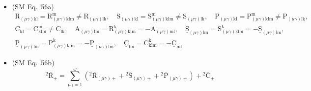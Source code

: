 \documentclass[
    12pt,              %
    a4paper,           %
    headings=normal,   %
    twoside=true,      %
    BCOR=8mm,          %
]{scrbook}
\begin{document}
\begin{itemize}[label={},leftmargin=0pt]
    \item (SM Eq.\ 56a) 
    \[
    \begin{gathered}
    \mathrm{R}_{(\mu\gamma)\mathrm{kl}} = \mathrm{R}^\mathrm{m}_{(\mu\gamma)\mathrm{klm}} \ne \mathrm{R}_{(\mu\gamma)\mathrm{lk}}, \quad \mathrm{S}_{(\mu\gamma)\mathrm{kl}} = \mathrm{S}^\mathrm{m}_{(\mu\gamma)\mathrm{klm}} \ne \mathrm{S}_{(\mu\gamma)\mathrm{lk}}, \quad \mathrm{P}_{(\mu\gamma)\mathrm{kl}} = \mathrm{P}^\mathrm{m}_{(\mu\gamma)\mathrm{klm}} \ne \mathrm{P}_{(\mu\gamma)\mathrm{lk}}, \\
    \mathrm{C}_{\mathrm{kl}} = \mathrm{C}^\mathrm{m}_{\mathrm{klm}} \ne \mathrm{C}_{\mathrm{lk}}, \quad \mathrm{A}_{(\mu\gamma)\mathrm{lm}} = \mathrm{R}^\mathrm{k}_{(\mu\gamma)\mathrm{klm}} = -\mathrm{A}_{(\mu\gamma)\mathrm{ml}}, \quad \underline{\mathrm{S}}_{(\mu\gamma)\mathrm{lm}} = \mathrm{S}^\mathrm{k}_{(\mu\gamma)\mathrm{klm}} = -\underline{\mathrm{S}}_{(\mu\gamma)\mathrm{lm}}, \\
    \underline{\mathrm{P}}_{(\mu\gamma)\mathrm{lm}} = \mathrm{P}^\mathrm{k}_{(\mu\gamma)\mathrm{klm}} = -\underline{\mathrm{P}}_{(\mu\gamma)\mathrm{lm}}, \quad \underline{\mathrm{C}}_{\mathrm{lm}} = \mathrm{C}^\mathrm{k}_{\mathrm{klm}} = -\underline{\mathrm{C}}_{\mathrm{ml}}
    \end{gathered}
    \]

    \item (SM Eq.\ 56b) 
    \[
    {}^2\bar{\mathrm{R}}_\pm = \sum_{\mu\gamma=1}^{\omega} \left( {}^2\bar{\mathrm{R}}_{(\mu\gamma)\pm} + {}^2\bar{\mathrm{S}}_{(\mu\gamma)\pm} + {}^2\bar{\mathrm{P}}_{(\mu\gamma)\pm} \right) + {}^2\bar{\mathrm{C}}_\pm
    \]


\end{itemize}
\end{document}
